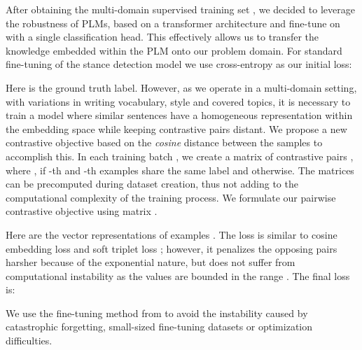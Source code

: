 \documentclass[11pt]{article}
\begin{document}
After obtaining the multi-domain supervised training set , we decided to leverage the robustness of PLMs, based on a transformer architecture \cite{vaswani2017attention} and fine-tune on  with a single classification head. This effectively allows us to transfer the knowledge embedded within the PLM onto our problem domain. For standard fine-tuning of the stance detection model  we use cross-entropy as our initial loss:


Here  is the ground truth label. However, as we operate in a multi-domain setting, with variations in writing vocabulary, style and covered topics, it is necessary to train a model where similar sentences have a homogeneous representation within the embedding space while keeping contrastive pairs distant. We propose a new contrastive objective based on the \textit{cosine} distance between the samples to accomplish this. In each training batch , we create a matrix of contrastive pairs , where ,  if -th and -th examples share the same label and  otherwise. The matrices can be precomputed during dataset creation, thus not adding to the computational complexity of the training process. We formulate our pairwise contrastive objective  using matrix .



Here  are the vector representations of examples . The loss is similar to cosine embedding loss and soft triplet loss
 \citep{barz2020deep,qian2019softtriple}; however, it penalizes the opposing pairs harsher because of the exponential nature, but does not suffer from computational instability as the values are bounded in the range . 
 The final loss is:  

We use the fine-tuning method from \citet{mosbach2020stability, liu2019roberta} to avoid the instability caused by catastrophic forgetting, small-sized fine-tuning datasets or optimization difficulties.
\end{document}
